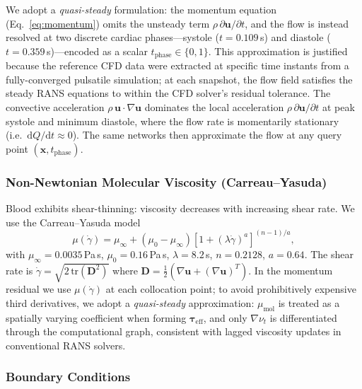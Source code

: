 \documentclass[11pt,a4paper]{article}
\begin{document}
We adopt a \emph{quasi-steady} formulation: the momentum equation (Eq.~\ref{eq:momentum}) omits the unsteady term $\rho\,\partial\mathbf{u}/\partial t$, and the flow is instead resolved at two discrete cardiac phases---systole ($t = 0.109$\,s) and diastole ($t = 0.359$\,s)---encoded as a scalar $t_{\text{phase}} \in \{0,1\}$. This approximation is justified because the reference CFD data were extracted at specific time instants from a fully-converged pulsatile simulation; at each snapshot, the flow field satisfies the steady RANS equations to within the CFD solver's residual tolerance. The convective acceleration $\rho\,\mathbf{u}\cdot\nabla\mathbf{u}$ dominates the local acceleration $\rho\,\partial\mathbf{u}/\partial t$ at peak systole and minimum diastole, where the flow rate is momentarily stationary (i.e.\ $\mathrm{d}Q/\mathrm{d}t \approx 0$). The same networks then approximate the flow at any query point $(\mathbf{x}, t_{\text{phase}})$.

\subsubsection{Non-Newtonian Molecular Viscosity (Carreau--Yasuda)}
\label{sec:carreau}

Blood exhibits shear-thinning: viscosity decreases with increasing shear rate. We use the Carreau--Yasuda model
\begin{equation}
\mu(\dot{\gamma}) = \mu_\infty + (\mu_0 - \mu_\infty) \left[ 1 + (\lambda \dot{\gamma})^a \right]^{(n-1)/a},
\label{eq:carreau}
\end{equation}
with $\mu_\infty = 0.0035$\,Pa\,s, $\mu_0 = 0.16$\,Pa\,s, $\lambda = 8.2$\,s, $n = 0.2128$, $a = 0.64$. The shear rate is $\dot{\gamma} = \sqrt{2\,\mathrm{tr}(\mathbf{D}^2)}$ where $\mathbf{D} = \frac{1}{2}(\nabla\mathbf{u} + (\nabla\mathbf{u})^T)$. In the momentum residual we use $\mu(\dot{\gamma})$ at each collocation point; to avoid prohibitively expensive third derivatives, we adopt a \emph{quasi-steady} approximation: $\mu_{\text{mol}}$ is treated as a spatially varying coefficient when forming $\boldsymbol{\tau}_{\text{eff}}$, and only $\nabla\nu_t$ is differentiated through the computational graph, consistent with lagged viscosity updates in conventional RANS solvers.

\subsubsection{Boundary Conditions}
\end{document}
